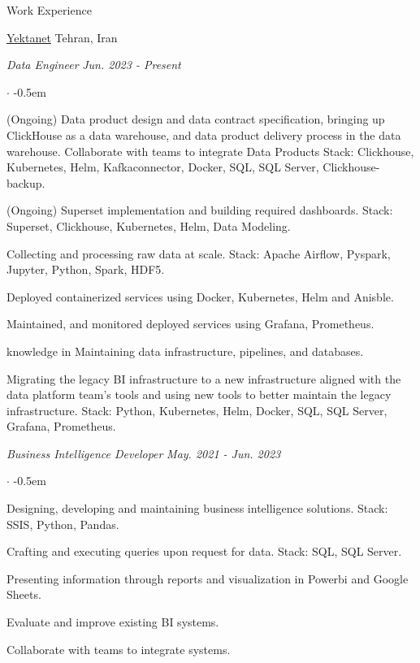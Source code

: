 \documentclass[../professional-cv.tex]{subfiles}
\begin{document}
\begin{rSection}{Work Experience}

	\begin{rWorkSection}
		{\href{https://https://yektanet.com//}{Yektanet}}
		{Tehran, Iran}

		\vspace{-1em}
		{\em Data Engineer} \hfill {\em Jun. 2023 - Present} \hspace{10pt}
		\normalfont
		\begin{list}{$\cdot$}{\leftmargin=10pt\normalfont \rightmargin=20pt}
			\itemsep -0.5em
			\item (Ongoing) Data product design and data contract specification, bringing up ClickHouse as a data warehouse, and data product delivery process in the data warehouse. 
   			       Collaborate with teams to integrate Data Products
   			       Stack: Clickhouse, Kubernetes, Helm, Kafkaconnector, Docker, SQL, SQL Server, Clickhouse-backup.
			\item (Ongoing) Superset implementation and building required dashboards. Stack: Superset, Clickhouse, Kubernetes, Helm, Data Modeling.
			\item Collecting and processing raw data at scale. Stack: Apache Airflow, Pyspark, Jupyter, Python, Spark, HDF5.
			\item Deployed containerized services using Docker, Kubernetes, Helm and Anisble.
			\item Maintained, and monitored deployed services using Grafana, Prometheus.
			\item knowledge in Maintaining data infrastructure, pipelines, and databases.
   			\item Migrating the legacy BI infrastructure to a new infrastructure aligned with the data platform team's tools and using new tools to better maintain the legacy infrastructure.
      			      Stack: Python, Kubernetes, Helm, Docker, SQL, SQL Server, Grafana, Prometheus.


		\end{list}
		{\em Business Intelligence Developer} \hfill {\em May. 2021 - Jun. 2023}
		\normalfont
		\begin{list}{$\cdot$}{\leftmargin=10pt\normalfont \rightmargin=20pt}
			\itemsep -0.5em
			\item Designing, developing and maintaining business intelligence solutions. Stack: SSIS, Python, Pandas.
			\item Crafting and executing queries upon request for data. Stack: SQL, SQL Server.
			\item Presenting information through reports and visualization in Powerbi and Google Sheets.
			\item Evaluate and improve existing BI systems.
			\item Collaborate with teams to integrate systems.
		\end{list}
	\end{rWorkSection}


\end{rSection}
\end{document}
